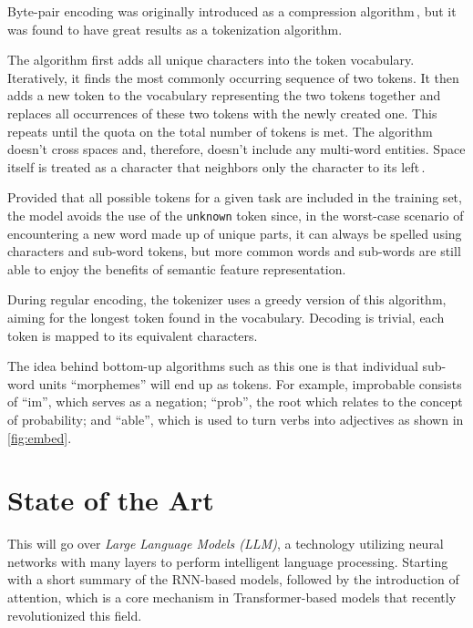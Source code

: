 \medskip

Byte-pair encoding was originally introduced as a compression algorithm\,\cite{bytePair1994}, but it was found to have great results as a tokenization algorithm.

The algorithm first adds all unique characters into the token vocabulary. Iteratively, it finds the most commonly occurring sequence of two tokens. It then adds a new token to the vocabulary representing the two tokens together and replaces all occurrences of these two tokens with the newly created one. This repeats until the quota on the total number of tokens is met. The algorithm doesn't cross spaces and, therefore, doesn't include any multi-word entities. Space itself is treated as a character that neighbors only the character to its left\,\cite{sennrich-etal-2016-neural}.

Provided that all possible tokens for a given task are included in the training set, the model avoids the use of the \texttt{unknown} token since, in the worst-case scenario of encountering a new word made up of unique parts, it can always be spelled using characters and sub-word tokens, but more common words and sub-words are still able to enjoy the benefits of semantic feature representation.

\medskip

During regular encoding, the tokenizer uses a greedy version of this algorithm, aiming for the longest token found in the vocabulary. Decoding is trivial, each token is mapped to its equivalent characters.

The idea behind bottom-up algorithms such as this one is that individual sub-word units ``morphemes'' will end up as tokens. For example, improbable consists of ``im'', which serves as a negation; ``prob'', the root which relates to the concept of probability; and ``able'', which is used to turn verbs into adjectives as shown in \ref{fig:embed}.

\chapter{State of the Art}
\label{sec:llm}
This will go over \emph{Large Language Models (LLM)}, a technology utilizing neural networks with many layers to perform intelligent language processing. Starting with a short summary of the RNN-based models, followed by the introduction of attention, which is a core mechanism in Transformer-based models that recently revolutionized this field. 

